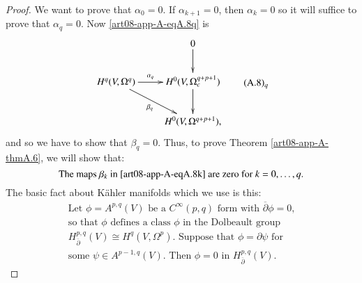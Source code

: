 \begin{proof}
We want to prove that $\alpha_{0}=0$. If $\alpha_{k+1}=0$, then $\alpha_{k}=0$ so it will suffice to prove that $\alpha_{q}=0$. Now \ref{art08-app-A-eqA.8q} is
\begin{equation*}
\vcenter{\xymatrix{
 & 0\ar[d]\\
H^{q}(V,\Omega^{q})\ar[dr]_-{\beta_{q}}\ar[r]^-{\alpha_{q}} & H^{0}(V,\Omega^{q+p+1}_{c})\ar[d]\\
 & H^{0}(V,\Omega^{q+p+1}),
}}\tag*{(A.8)$_{q}$}\label{art08-app-A-eqA.8q}
\end{equation*}
and so we have to show that $\beta_{q}=0$. Thus, to prove Theorem \ref{art08-app-A-thmA.6}, we will show that:
\setcounter{equation}{8}
\begin{equation}
\text{The maps $\beta_{k}$ in \ref{art08-app-A-eqA.8k} are zero for } k=0,\ldots,q.\label{art08-app-A-eqA.9}
\end{equation}
The basic fact about K\"ahler manifolds which we use is this:
\begin{equation}
\begin{array}{l}
\text{Let $\phi=A^{p,q}(V)$ be a $C^{\infty}(p,q)$ form with $\overline{\partial}\phi=0$,}\\
\text{so that $\phi$ defines a class $\phi$ in the Dolbeault group}\\
\text{$H^{p,q}_{\overline{\partial}}(V)\cong H^{q}(V,\Omega^{p})$. Suppose that $\phi=\partial\psi$ for}\\
\text{some $\psi\in A^{p-1,q}(V)$. Then $\phi=0$ in $H^{p,q}_{\overline{\partial}}(V)$.}
\end{array}\label{art08-app-A-eqA.10}
\end{equation}
\end{proof}


